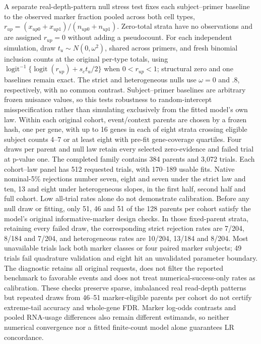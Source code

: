 \documentclass[11pt]{article}
\begin{document}
A separate real-depth-pattern null stress test fixes each subject--primer baseline to the observed marker fraction pooled across both cell types, \(r_{up}=(x_{up0}+x_{up1})/(n_{up0}+n_{up1})\). Zero-total strata have no observations and are assigned \(r_{up}=0\) without adding a pseudocount. For each independent simulation, draw \(t_u\sim N(0,\omega^2)\), shared across primers, and fresh binomial inclusion counts at the original per-type totals, using \(\operatorname{logit}^{-1}\{\operatorname{logit}(r_{up})+s_ct_u/2\}\) when \(0<r_{up}<1\); structural zero and one baselines remain exact. The strict and heterogeneous nulls use \(\omega=0\) and .8, respectively, with no common contrast. Subject--primer baselines are arbitrary frozen nuisance values, so this tests robustness to random-intercept misspecification rather than simulating exclusively from the fitted model's own law. Within each original cohort, event/context parents are chosen by a frozen hash, one per gene, with up to 16 genes in each of eight strata crossing eligible subject counts 4--7 or at least eight with pre-fit gene-coverage quartiles. Four draws per parent and null law retain every selected zero-evidence and failed trial at p-value one. The completed family contains 384 parents and 3,072 trials. Each cohort--law panel has 512 requested trials, with 170--189 usable fits. Native nominal-5\% rejections number seven, eight and seven under the strict law and ten, 13 and eight under heterogeneous slopes, in the first half, second half and full cohort. Low all-trial rates alone do not demonstrate calibration. Before any null draw or fitting, only 51, 46 and 51 of the 128 parents per cohort satisfy the model's original informative-marker design checks. In those fixed-parent strata, retaining every failed draw, the corresponding strict rejection rates are 7/204, 8/184 and 7/204, and heterogeneous rates are 10/204, 13/184 and 8/204. Most unavailable trials lack both marker classes or four paired marker subjects; 49 trials fail quadrature validation and eight hit an unvalidated parameter boundary. The diagnostic retains all original requests, does not filter the reported benchmark to favorable events and does not treat numerical-success-only rates as calibration. These checks preserve sparse, imbalanced real read-depth patterns but repeated draws from 46--51 marker-eligible parents per cohort do not certify extreme-tail accuracy and whole-gene FDR. Marker log-odds contrasts and pooled RNA-usage differences also remain different estimands, so neither numerical convergence nor a fitted finite-count model alone guarantees LR concordance.
\end{document}
